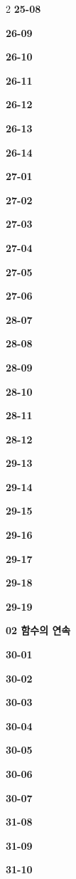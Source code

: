 \documentclass[10pt,a4paper]{article}
\begin{document}
\begin{multicols}{2}
\noindent\textbf{25-08}\ \par
\noindent\textbf{26-09}\ \par
\noindent\textbf{26-10}\ \par
\noindent\textbf{26-11}\ \par
\noindent\textbf{26-12}\ \par
\noindent\textbf{26-13}\ \par
\noindent\textbf{26-14}\ \par
\noindent\textbf{27-01}\ \par
\noindent\textbf{27-02}\ \par
\noindent\textbf{27-03}\ \par
\noindent\textbf{27-04}\ \par
\noindent\textbf{27-05}\ \par
\noindent\textbf{27-06}\ \par
\noindent\textbf{28-07}\ \par
\noindent\textbf{28-08}\ \par
\noindent\textbf{28-09}\ \par
\noindent\textbf{28-10}\ \par
\noindent\textbf{28-11}\ \par
\noindent\textbf{28-12}\ \par
\noindent\textbf{29-13}\ \par
\noindent\textbf{29-14}\ \par
\noindent\textbf{29-15}\ \par
\noindent\textbf{29-16}\ \par
\noindent\textbf{29-17}\ \par
\noindent\textbf{29-18}\ \par
\noindent\textbf{29-19}\ \par
\noindent\textbf{02 함수의 연속}\par\smallskip
\noindent\textbf{30-01}\ \par
\noindent\textbf{30-02}\ \par
\noindent\textbf{30-03}\ \par
\noindent\textbf{30-04}\ \par
\noindent\textbf{30-05}\ \par
\noindent\textbf{30-06}\ \par
\noindent\textbf{30-07}\ \par
\noindent\textbf{31-08}\ \par
\noindent\textbf{31-09}\ \par
\noindent\textbf{31-10}\ \par

\end{multicols}
\end{document}
